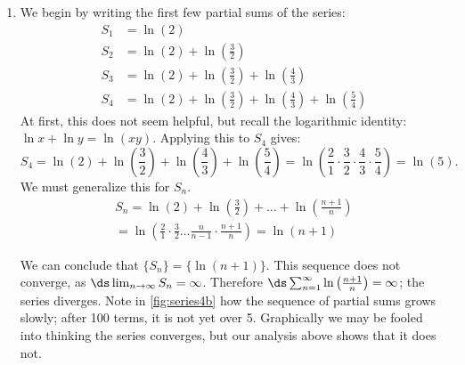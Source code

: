 \begin{example}
\begin{enumerate}
\item	We begin by writing the first few partial sums of the series:
\begin{align*}
S_1 &= \ln\left(2\right) \\
S_2 &= \ln\left(2\right)+\ln\left(\frac32\right) \\
S_3 &= \ln\left(2\right)+\ln\left(\frac32\right)+\ln\left(\frac43\right) \\
S_4 &= \ln\left(2\right)+\ln\left(\frac32\right)+\ln\left(\frac43\right)
+\ln\left(\frac54\right) 
\end{align*}
At first, this does not seem helpful, but recall the logarithmic identity: $\ln x+\ln y = \ln (xy).$ Applying this to $S_4$ gives:
\[
S_4 = \ln\left(2\right)+\ln\left(\frac32\right)+\ln\left(\frac43\right)
+\ln\left(\frac54\right)
=\ln\left(\frac21\cdot\frac32\cdot\frac43\cdot\frac54\right)
=\ln\left(5\right).
\]
We must generalize this for $S_n$.
\begin{multline*}
S_n=\ln\left(2\right)+\ln\left(\frac32\right)+\dots +\ln \left(\frac{n+1}{n}\right)\\
=\ln\left(\frac21\cdot\frac32 \dots  \frac{n}{n-1}\cdot \frac{n+1}{n}\right)
=\ln(n+1)
\end{multline*}


We can conclude that $\{S_n\} = \bigl\{\ln (n+1)\bigr\}$. This sequence  does not converge, as $\ds \lim_{n\to\infty}S_n=\infty$. Therefore  $\ds\sum_{n=1}^\infty  \ln\left(\frac{n+1}{n}\right)=\infty$; the series diverges. Note in \autoref{fig:series4b} how the sequence of partial sums grows slowly; after 100 terms, it is not yet over 5. Graphically we may be fooled into thinking the series converges, but our analysis above shows that it does not.
\end{enumerate}
\end{example}

